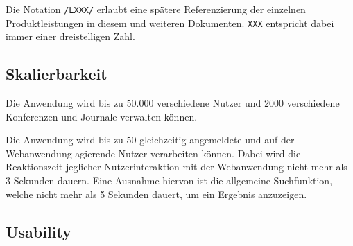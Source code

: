 
Die Notation \texttt{/LXXX/} erlaubt eine spätere Referenzierung der einzelnen Produktleistungen in diesem und weiteren
Dokumenten. \texttt{XXX} entspricht dabei immer einer dreistelligen Zahl.

\subsection{Skalierbarkeit}

\begin{description}

	 Die Anwendung wird bis zu 50.000 verschiedene Nutzer und 2000 verschiedene Konferenzen und Journale verwalten können.

	 Die Anwendung wird bis zu 50 gleichzeitig angemeldete und auf der Webanwendung agierende Nutzer verarbeiten können. Dabei wird die Reaktionszeit jeglicher Nutzerinteraktion mit der Webanwendung nicht mehr als 3 Sekunden dauern. Eine Ausnahme hiervon ist die allgemeine Suchfunktion, welche nicht mehr als 5 Sekunden dauert, um ein Ergebnis anzuzeigen.

\end{description}

\subsection{Usability}

